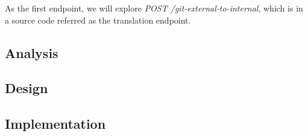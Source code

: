 \documentclass[../main.tex]{subfiles}
\begin{document}
As the first endpoint, we will explore \textit{POST /git-external-to-internal}, which is in a source code referred as the translation endpoint.

\subsection{Analysis}
\label{subsection:translation-analysis}


\subsection{Design}


\subsection{Implementation}

\end{document}
